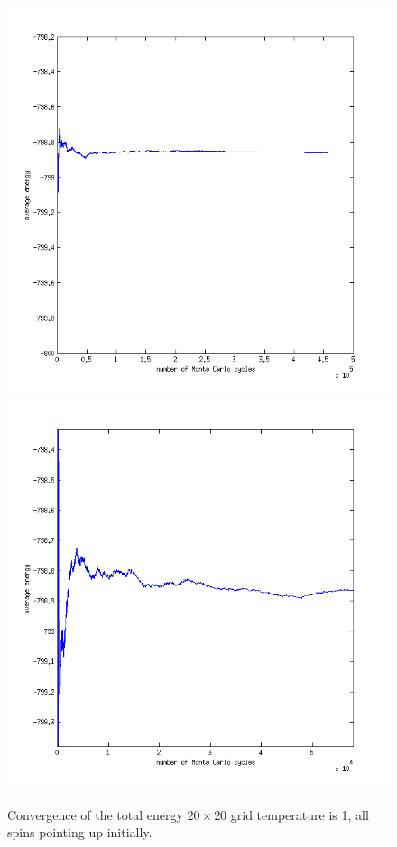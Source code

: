 \documentclass[a4paper,english, 10pt, twoside]{article}
\begin{document}
\begin{figure}[H]
\includegraphics[scale=0.5]{energy_ordered_temp1.png}
\includegraphics[scale=0.5]{energy_ordered_temp1_zoom.png}
\caption{Convergence of the total energy $20 \times 20$ grid temperature is 1, all spins pointing up initially.}
\label{energy_ordered_temp1}
\end{figure}
\end{document}
